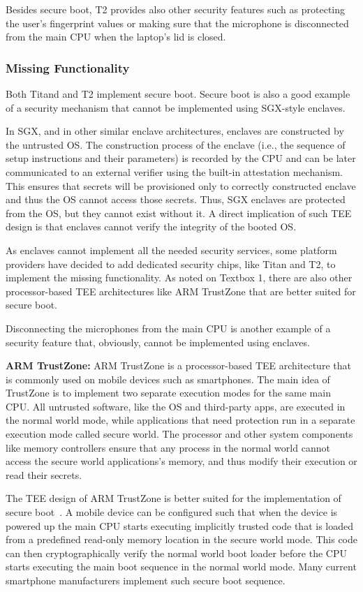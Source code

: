 Besides secure boot, T2 provides also other security features such as protecting the user’s fingerprint values or making sure that the microphone is disconnected from the main CPU when the laptop’s lid is closed. 
 
 
\subsubsection*{Missing Functionality}
  
Both Titand and T2 implement secure boot. Secure boot is also a good example of a security mechanism that cannot be implemented using SGX-style enclaves. 

In SGX, and in other similar enclave architectures, enclaves are constructed by the untrusted OS. The construction process of the enclave (i.e., the sequence of setup instructions and their parameters) is recorded by the CPU and can be later communicated to an external verifier using the built-in attestation mechanism. This ensures that secrets will be provisioned only to correctly constructed enclave and thus the OS cannot access those secrets. Thus, SGX enclaves are protected from the OS, but they cannot exist without it. A direct implication of such TEE design is that enclaves cannot verify the integrity of the booted OS. 

As enclaves cannot implement all the needed security services, some platform providers have decided to add dedicated security chips, like Titan and T2, to implement the missing functionality. As noted on Textbox 1, there are also other processor-based TEE architectures like ARM TrustZone that are better suited for secure boot.

Disconnecting the microphones from the main CPU is another example of a security feature that, obviously, cannot be implemented using enclaves.
  
  
\begin{tcolorbox}
\textbf{ARM TrustZone:} ARM TrustZone is a processor-based TEE architecture that is commonly used on mobile devices such as smartphones. The main idea of TrustZone is to implement two separate execution modes for the same main CPU. All untrusted software, like the OS and third-party apps, are executed in the normal world mode, while applications that need protection run in a separate execution mode called secure world. The processor and other system components like memory controllers ensure that any process in the normal world cannot access the secure world applications’s memory, and thus modify their execution or read their secrets.

The TEE design of ARM TrustZone is better suited for the implementation of secure boot~\cite{arbaugh1997secure}. A mobile device can be configured such that when the device is powered up the main CPU starts executing implicitly trusted code that is loaded from a predefined read-only memory location in the secure world mode. This code can then cryptographically verify the normal world boot loader before the CPU starts executing the main boot sequence in the normal world mode. Many current smartphone manufacturers implement such secure boot sequence.
\end{tcolorbox}


